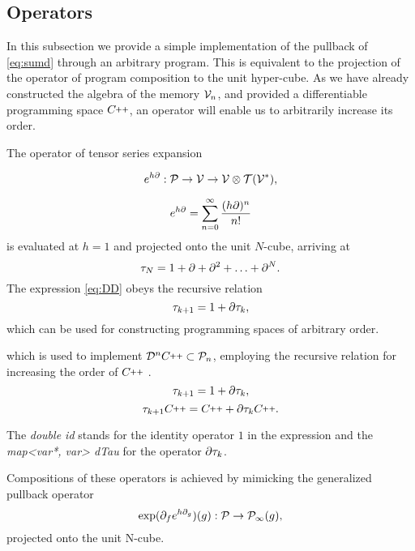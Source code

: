              
\subsection{Operators}\label{sec:operators}

In this subsection we provide a simple implementation of the pullback of \eqref{eq:sumd} through an arbitrary program. This is equivalent to the projection of the operator of program composition to the unit hyper-cube. As we have already constructed the algebra of the memory $\mathcal{V}_n$, and provided a differentiable programming space $\CC$, an operator will enable us to arbitrarily increase its order.

The operator of tensor series expansion \cite[Theorem~5.1]{OperationalCalculus}

\begin{equation}\label{eq:specProg}
            e^{h\partial}:\mathcal{P}\to\mathcal{V}\to \mathcal{V}\otimes \mathcal{T}(\mathcal{V}^*),
          \end{equation}

\begin{equation}
  e^{h\partial}=\sum\limits_{n=0}^{\infty}\frac{(h\partial)^n}{n!}
 \end{equation}
 is evaluated at $h=1$ and projected onto the unit $N$-cube, arriving at 
\begin{equation}\label{eq:DD}
    \tau_N = 1+\partial +\partial^2 +\ldots + \partial^N.
  \end{equation}
The expression \eqref{eq:DD} obeys the recursive relation
\begin{equation}
      \label{eq:rekurzija}
      \tau_{k+1} = 1+\partial\tau_k,
    \end{equation}
which can be used for constructing programming spaces of arbitrary order.


which is used to implement $\DD^n\CC\subset\dP_n$, employing the recursive relation for increasing the order of $\CC$ \cite[Proposition~5.1]{OperationalCalculus}.
\begin{equation}
      \label{eq:rekurzija}
      \tau_{k+1} = 1+\partial\tau_k,
    \end{equation}
\begin{equation}
\sumd_{k+1}\CC = \CC+\D\sumd_k\CC.
\end{equation}
        
        The \emph{double id} stands for the identity operator $1$ in the expression and the \emph{map<var*, var> dTau} for the operator $\partial\tau_k$.
        
        Compositions of these operators is achieved by mimicking the generalized pullback operator \cite[Remark~11]{OperationalCalculus}
        \begin{equation}\label{eq:opKompo}
          \exp(\partial_fe^{h\partial_g})(g): \mathcal{P}\to\mathcal{P}_\infty(g),
          \end{equation}
          projected onto the unit N-cube.
          
